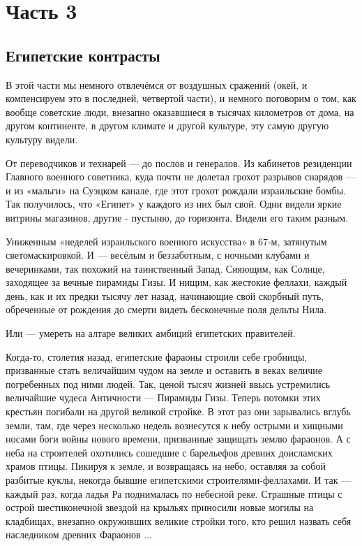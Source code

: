 \chapter{Часть 3}
\section{Египетские контрасты}

В этой части мы немного отвлечёмся от воздушных сражений (окей, и компенсируем это в последней, четвертой части), и немного поговорим о том, как вообще советские люди, внезапно оказавшиеся в тысячах километров от дома, на другом континенте, в другом климате и другой культуре, эту самую другую культуру видели.

От переводчиков и технарей — до послов и генералов. Из кабинетов резиденции Главного военного советника, куда почти не долетал грохот разрывов снарядов — и из «мальги» на Суэцком канале, где этот грохот рождали израильские бомбы. Так получилось, что «Египет» у каждого из них был свой. Одни видели яркие витрины магазинов, другие - пустыню, до горизонта. Видели его таким разным.

Униженным «неделей израильского военного искусства» в 67-м, затянутым светомаскировкой. И — весёлым и беззаботным, с ночными клубами и вечеринками, так похожий на таинственный Запад. Сияющим, как Солнце, заходящее за вечные пирамиды Гизы. И нищим, как жестокие феллахи, каждый день, как и их предки тысячу лет назад, начинающие свой скорбный путь, обреченные от рождения до смерти видеть бесконечные поля дельты Нила.

Или — умереть на алтаре великих амбиций египетских правителей.

Когда-то, столетия назад, египетские фараоны строили себе гробницы, призванные стать величайшим чудом на земле и оставить в веках величие погребенных под ними людей. Так, ценой тысяч жизней ввысь устремились величайшие чудеса Античности — Пирамиды Гизы. Теперь потомки этих крестьян погибали на другой великой стройке. В этот раз они зарывались вглубь земли, там, где через несколько недель вознесутся к небу острыми и хищными носами боги войны нового времени, призванные защищать землю фараонов. А с неба на строителей охотились сошедшие с барельефов древних доисламских храмов птицы. Пикируя к земле, и возвращаясь на небо, оставляя за собой разбитые куклы, некогда бывшие египетскими строителями-феллахами. И так — каждый раз, когда ладья Ра поднималась по небесной реке. Страшные птицы с острой шестиконечной звездой на крыльях приносили новые могилы на кладбищах, внезапно окруживших великие стройки того, кто решил назвать себя наследником древних Фараонов ...

